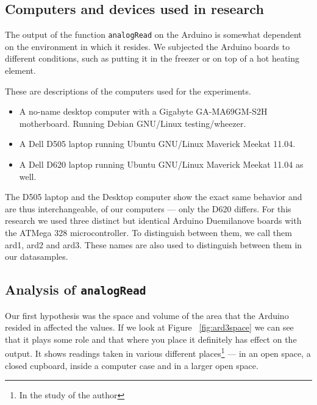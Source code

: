 \documentclass[a4paper]{article}           %
\begin{document}
\subsection{Computers and devices used in research}

The output of the function \texttt{analogRead} on the Arduino is somewhat dependent on the environment in which it resides. We subjected the Arduino boards to different conditions, such as putting it in the freezer or on top of a hot heating element. 

These are descriptions of the computers used for the experiments. 


\begin{itemize}
\item A no-name desktop computer with a Gigabyte GA-MA69GM-S2H motherboard. Running Debian GNU/Linux testing/wheezer.
\item A Dell D505 laptop running Ubuntu GNU/Linux Maverick Meekat 11.04.
\item A Dell D620 laptop running Ubuntu GNU/Linux Maverick Meekat 11.04 as well. 
\end{itemize}

The D505 laptop and the Desktop computer show the exact same behavior and are thus interchangeable, of our computers --- only the D620 differs. For this research we used three distinct but identical Arduino Duemilanove boards with the ATMega 328 microcontroller. To distinguish between them, we call them ard1, ard2 and ard3. These names are also used to distinguish between them in our datasamples. 

\subsection{Analysis of \texttt{analogRead}}


Our first hypothesis was the space and volume of the area that the Arduino resided in affected the values. If we look at Figure ~\ref{fig:ard3space} we can see that it plays some role and that where you place it definitely has effect on the output. It shows readings taken in various different places\footnote{In the study of the author} --- in an open space, a closed cupboard, inside a computer case and in a larger open space. 
\end{document}
